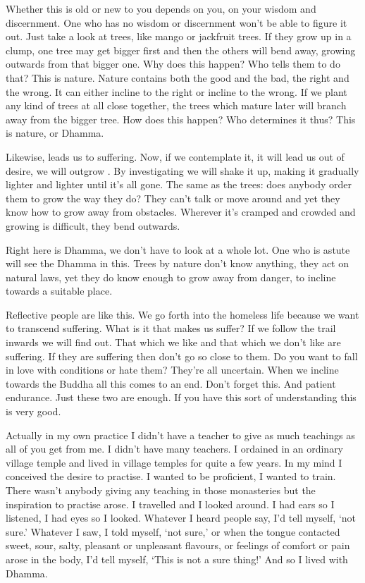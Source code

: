 Whether this is old or new to you depends on you, on your wisdom and discernment. One who has no wisdom or discernment won't be able to figure it out. Just take a look at trees, like mango or jackfruit trees. If they grow up in a clump, one tree may get bigger first and then the others will bend away, growing outwards from that bigger one. Why does this happen? Who tells them to do that? This is nature. Nature contains both the good and the bad, the right and the wrong. It can either incline to the right or incline to the wrong. If we plant any kind of trees at all close together, the trees which mature later will branch away from the bigger tree. How does this happen? Who determines it thus? This is nature, or Dhamma. 

Likewise,  leads us to suffering. Now, if we contemplate it, it will lead us out of desire, we will outgrow . By investigating  we will shake it up, making it gradually lighter and lighter until it's all gone. The same as the trees: does anybody order them to grow the way they do? They can't talk or move around and yet they know how to grow away from obstacles. Wherever it's cramped and crowded and growing is difficult, they bend outwards. 

Right here is Dhamma, we don't have to look at a whole lot. One who is astute will see the Dhamma in this. Trees by nature don't know anything, they act on natural laws, yet they do know enough to grow away from danger, to incline towards a suitable place. 

Reflective people are like this. We go forth into the homeless life because we want to transcend suffering. What is it that makes us suffer? If we follow the trail inwards we will find out. That which we like and that which we don't like are suffering. If they are suffering then don't go so close to them. Do you want to fall in love with conditions or hate them? They're all uncertain. When we incline towards the Buddha all this comes to an end. Don't forget this. And patient endurance. Just these two are enough. If you have this sort of understanding this is very good. 

Actually in my own practice I didn't have a teacher to give as much teachings as all of you get from me. I didn't have many teachers. I ordained in an ordinary village temple and lived in village temples for quite a few years. In my mind I conceived the desire to practise. I wanted to be proficient, I wanted to train. There wasn't anybody giving any teaching in those monasteries but the inspiration to practise arose. I travelled and I looked around. I had ears so I listened, I had eyes so I looked. Whatever I heard people say, I'd tell myself, `not sure.' Whatever I saw, I told myself, `not sure,' or when the tongue contacted sweet, sour, salty, pleasant or unpleasant flavours, or feelings of comfort or pain arose in the body, I'd tell myself, `This is not a sure thing!' And so I lived with Dhamma. 

